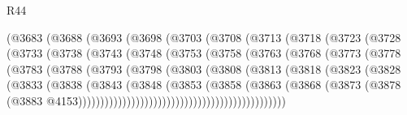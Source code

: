 \begin{lexlean}{R44}
\begin{coremodule}
{                (@3683
                  (@3688
                    (@3693
                      (@3698
                        (@3703
                          (@3708
                            (@3713
                              (@3718
                                (@3723
                                  (@3728
                                    (@3733
                                      (@3738
                                        (@3743
                                          (@3748
                                            (@3753
                                              (@3758
                                                (@3763
                                                  (@3768
                                                    (@3773
                                                      (@3778
                                                        (@3783
                                                          (@3788
                                                            (@3793
                                                              (@3798
                                                                (@3803
                                                                  (@3808
                                                                    (@3813
                                                                      (@3818
                                                                        (@3823
                                                                          (@3828
                                                                            (@3833
                                                                              (@3838
                                                                                (@3843
                                                                                  (@3848
                                                                                    (@3853
                                                                                      (@3858
                                                                                        (@3863
                                                                                          (@3868
                                                                                            (@3873
                                                                                              (@3878
                                                                                                (@3883
                                                                                                  @4153)))))))))))))))))))))))))))))))))))))))))))))))
}
\end{coremodule}
\end{lexlean}
